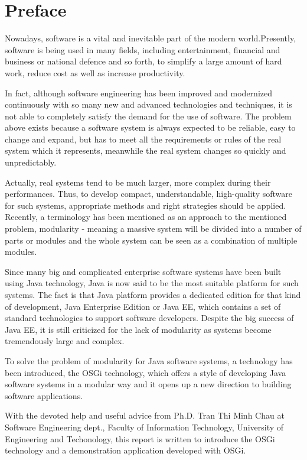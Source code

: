 \chapter*{Preface}

Nowadays, software is a vital and inevitable part of the modern world.Presently, software is being used in many fields, including entertainment, financial and business or national defence and so forth, to simplify a large amount of hard work, reduce cost as well as increase productivity.

In fact, although software engineering has been improved and modernized continuously with so many new and advanced technologies and techniques, it is not able to completely satisfy the demand for the use of software. The problem above exists because a software system is always expected to be reliable, easy to change and expand, but has to meet all the requirements or rules of the real system which it represents, meanwhile the real system changes so quickly and unpredictably. 

Actually, real systems tend to be much larger, more complex during their performances. Thus, to develop compact, understandable, high-quality software for such systems, appropriate methods and right strategies should be applied. Recently, a terminology has been mentioned as an approach to the mentioned problem, modularity - meaning a massive system will be divided into a number of parts or modules and the whole system can be seen as a combination of multiple modules. 

Since many big and complicated enterprise software systems have been built using Java technology, Java is now said to be the most suitable platform for such systems. The fact is that Java platform provides a dedicated edition for that kind of development, Java Enterprise Edition or Java EE, which contains a set of standard technologies to support software developers. Despite the big success of Java EE, it is still criticized for the lack of modularity as systems become tremendously large and complex.

To solve the problem of modularity for Java software systems, a technology has been introduced, the OSGi technology, which offers a style of developing Java software systems in a modular way and it opens up a new direction to building software applications.
 
With the devoted help and useful advice from Ph.D. Tran Thi Minh Chau at Software Engineering dept., Faculty of Information Technology, University of Engineering and Techonology, this report is written to introduce the OSGi technology and a demonstration application developed with OSGi.
   

